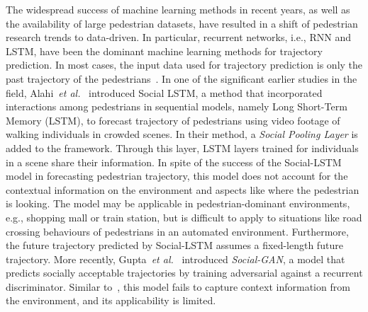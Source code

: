 The widespread success of machine learning methods in recent years, as well as the availability of large pedestrian datasets, have resulted in a shift of pedestrian research trends to data-driven. In particular, recurrent networks, i.e., RNN and LSTM, have been the dominant machine learning methods for trajectory prediction. In most cases, the input data used for trajectory prediction is only the past trajectory of the pedestrians~\cite{xue2019location,zhang2019sr,alahi2016social,gupta2018social}. In one of the significant earlier studies in the field, Alahi~\textit{et al.}~\cite{alahi2016social} introduced Social LSTM, a method that incorporated interactions among pedestrians in sequential models, namely Long Short-Term Memory (LSTM), to forecast trajectory of pedestrians using video footage of walking individuals in crowded scenes. In their method, a \textit{Social Pooling Layer} is added to the framework. Through this layer, LSTM layers trained for individuals in a scene share their information. In spite of the success of the Social-LSTM model in forecasting pedestrian trajectory, this model does not account for the contextual information on the environment and aspects like where the pedestrian is looking. The model may be applicable in pedestrian-dominant environments, e.g., shopping mall or train station, but is difficult to apply to situations like road crossing behaviours of pedestrians in an automated environment. Furthermore, the future trajectory predicted by Social-LSTM assumes a fixed-length future trajectory.  More recently, Gupta~\textit{et al.}~\cite{gupta2018social} introduced \textit{Social-GAN}, a model that predicts socially acceptable trajectories by training adversarial against a recurrent discriminator. Similar to~\cite{alahi2016social}, this model fails to capture context information from the environment, and its applicability is limited.

